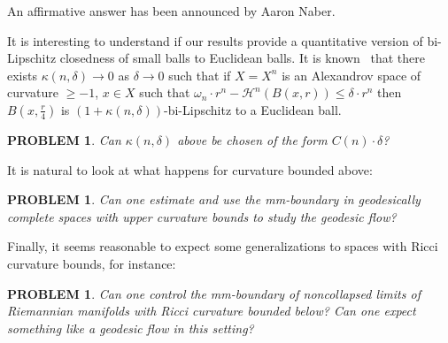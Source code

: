 \documentclass[12pt,leqno,intlimits]{amsart}
\numberwithin{equation}{section}
\newtheorem{quest}[thm]{PROBLEM}
\theoremstyle{definition}
\theoremstyle{remark}
\begin{document}
An affirmative answer  has been announced by Aaron Naber.


It is interesting to understand if our results provide a quantitative version of bi-Lipschitz closedness of small balls to Euclidean balls.
It is known~\cite{BGP} that there exists $\kappa(n,\delta)\to 0$ as $\delta\to 0$ such that if $X=X^n$ is an Alexandrov space of curvature $\ge -1$, $x\in X$ such that $\omega _n{\cdot}r^n -\mathcal H^n (B (x,r)) \leq \delta \cdot r ^n$ then $B (x,{\frac r 4})$ is $(1+\kappa(n,\delta))$-bi-Lipschitz to a Euclidean ball.
\begin{quest}
Can $\kappa(n,\delta)$ above be chosen
of the form $C(n)\cdot \delta$?
\end{quest}

It is natural to look at what happens for curvature bounded above:

\begin{quest} \label{qe:CAT}
Can one estimate and use the mm-boundary in geodesically complete spaces with upper curvature bounds to study the geodesic flow?
\end{quest}

Finally, it seems reasonable to expect some generalizations to spaces with Ricci curvature bounds, for instance:

\begin{quest}
Can one control the mm-boundary of noncollapsed limits of Riemannian manifolds with Ricci curvature bounded below? Can one expect something like a geodesic flow in this setting?
\end{quest}
\end{document}
